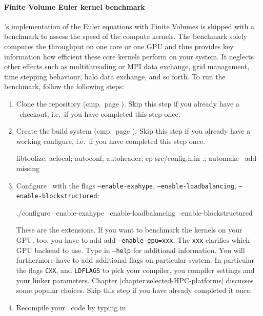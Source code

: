 \begin{framed}
\paragraph*{Finite Volume Euler kernel benchmark}

\ExaHyPE's implementation of the Euler equations with Finite Volumes is shipped
with a benchmark to assess the speed of the compute kernels.
The benchmark solely computes the throughput on one core or one GPU and thus
provides key information how efficient these core kernels perform on your
system.
It neglects other effects such as multithreading or MPI data exchange, grid
management, time stepping behaviour, halo data exchange, and so forth.
To run the benchmark, follow the following steps:


\label{page:exahype:kernel-benchmark}
\begin{enumerate}
  \item Clone the repository (cmp.~page
  \pageref{page::installation::git-clone}). Skip this step if you already have a
  \Peano\ checkout, i.e.~if you have completed this step once.
  \item Create the build system (cmp.~page
  \pageref{page::installation::configure}). Skip this step if you already have a
  working configure, i.e.~if you have completed this step once.
  \begin{bash}
libtoolize; aclocal; autoconf; autoheader; cp src/config.h.in .; automake --add-missing
  \end{bash}
  \item Configure \Peano\ with the flags \texttt{--enable-exahype},
  \texttt{--enable-loadbalancing}, \texttt{--enable-blockstructured}:
  \begin{bash}
./configure --enable-exahype --enable-loadbalancing --enable-blockstructured
  \end{bash}
   These are the extensions. 
   If you want to benchmark the kernels on your GPU, too, you have to add add \texttt{--enable-gpu=xxx}.
   The \texttt{xxx} clarifies which GPU backend to use. Type in \texttt{--help}
   for additional information. You will furthermore have to add additional flags
   on particular system.
   In particular the flags \texttt{CXX},  and \texttt{LDFLAGS} to pick your
   compiler, you compiler settings and your linker parameters. Chapter
   \ref{chapter:selected-HPC-platforms} discusses some popular choices. Skip
   this step if you have already completed it once.
  \item Recompile your \Peano\ code by typing in

\end{enumerate}
\end{framed}
